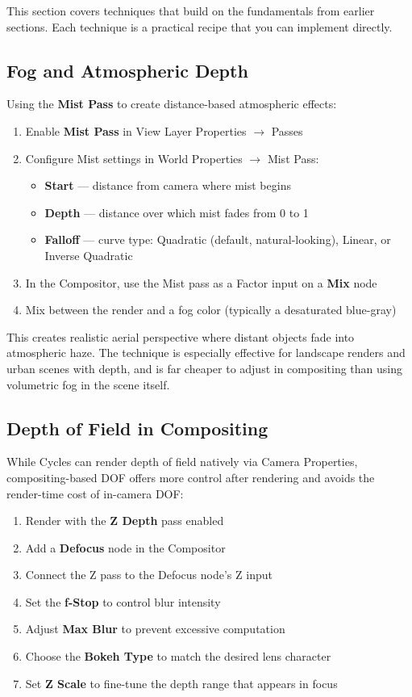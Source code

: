 This section covers techniques that build on the fundamentals from earlier sections. Each technique is a practical recipe that you can implement directly.

\subsection{Fog and Atmospheric Depth}

Using the \textbf{Mist Pass} to create distance-based atmospheric effects:

\begin{enumerate}[leftmargin=2em]
  \item Enable \textbf{Mist Pass} in View Layer Properties $\rightarrow$ Passes
  \item Configure Mist settings in World Properties $\rightarrow$ Mist Pass:
  \begin{itemize}[leftmargin=2em]
    \item \textbf{Start} --- distance from camera where mist begins
    \item \textbf{Depth} --- distance over which mist fades from 0 to 1
    \item \textbf{Falloff} --- curve type: Quadratic (default, natural-looking), Linear, or Inverse Quadratic
  \end{itemize}
  \item In the Compositor, use the Mist pass as a Factor input on a \textbf{Mix} node
  \item Mix between the render and a fog color (typically a desaturated blue-gray)
\end{enumerate}

This creates realistic aerial perspective where distant objects fade into atmospheric haze. The technique is especially effective for landscape renders and urban scenes with depth, and is far cheaper to adjust in compositing than using volumetric fog in the scene itself.

\subsection{Depth of Field in Compositing}

While Cycles can render depth of field natively via Camera Properties, compositing-based DOF offers more control after rendering and avoids the render-time cost of in-camera DOF:

\begin{enumerate}[leftmargin=2em]
  \item Render with the \textbf{Z Depth} pass enabled
  \item Add a \textbf{Defocus} node in the Compositor
  \item Connect the Z pass to the Defocus node's Z input
  \item Set the \textbf{f-Stop} to control blur intensity
  \item Adjust \textbf{Max Blur} to prevent excessive computation
  \item Choose the \textbf{Bokeh Type} to match the desired lens character
  \item Set \textbf{Z Scale} to fine-tune the depth range that appears in focus
\end{enumerate}

